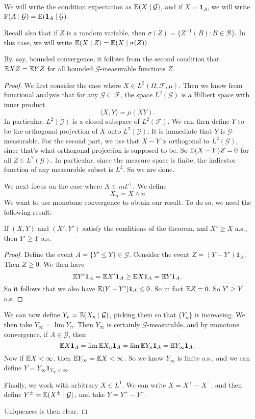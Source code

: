 \documentclass[a4paper]{article}
\begin{document}
We will write the condition expectation as $\mathbb{E}(X \mid \mathcal{G})$, and if $X = \mathbf{1}_A$, we will write $\mathbb{P}(A \mid \mathcal{G}) = \mathbb{E}(\mathbf{1}_A \mid \mathcal{G})$.

Recall also that if $Z$ is a random variable, then $\sigma(Z) = \{Z^{-1}(B): B \in \mathcal{B}\}$. In this case, we will write $\mathbb{E}(X \mid Z) = \mathbb{E}(X \mid \sigma(Z))$.

By, say, bounded convergence, it follows from the second condition that $\mathbb{E} XZ = \mathbb{E} YZ$ for all bounded $\mathcal{G}$-measurable functions $Z$.
\begin{proof}
  We first consider the case where $X \in L^2(\Omega, \mathcal{F}, \mu)$. Then we know from functional analysis that for any $\mathcal{G} \subseteq \mathcal{F}$, the space $L^2(\mathcal{G})$ is a Hilbert space with inner product
  \[
    \langle X, Y \rangle = \mu (X Y).
  \]
  In particular, $L^2(\mathcal{G})$ is a closed subspace of $L^2(\mathcal{F})$. We can then define $Y$ to be the orthogonal projection of $X$ onto $L^2(\mathcal{G})$. It is immediate that $Y$ is $\mathcal{G}$-measurable. For the second part, we use that $X - Y$ is orthogonal to $L^2(\mathcal{G})$, since that's what orthogonal projection is supposed to be. So $\mathbb{E}(X - Y)Z = 0$ for all $Z \in L^2(\mathcal{G})$. In particular, since the measure space is finite, the indicator function of any measurable subset is $L^2$. So we are done.

  We next focus on the case where $X \in m\mathcal{E}^+$. We define
  \[
    X_n = X \wedge n
  \]
  We want to use monotone convergence to obtain our result. To do so, we need the following result:

  \begin{claim}
    If $(X, Y)$ and $(X', Y')$ satisfy the conditions of the theorem, and $X' \geq X$ a.s., then $Y' \geq Y$ a.s.
  \end{claim}

  \begin{proof}
    Define the event $A = \{Y' \leq Y\} \in \mathcal{G}$. Consider the event $Z = (Y - Y')\mathbf{1}_A$. Then $Z \geq 0$. We then have
    \[
      \mathbb{E} Y' \mathbf{1}_A = \mathbb{E} X' \mathbf{1}_A \geq \mathbb{E} X \mathbf{1}_A = \mathbb{E} Y \mathbf{1}_A.
    \]
    So it follows that we also have $\mathbb{E}(Y - Y')\mathbf{1}_A \leq 0$. So in fact $\mathbb{E} Z = 0$. So $Y' \geq Y$ a.s.
  \end{proof}
  We can now define $Y_n = \mathbb{E}(X_n \mid \mathcal{G})$, picking them so that $\{Y_n\}$ is increasing. We then take $Y_\infty = \lim Y_n$. Then $Y_\infty$ is certainly $\mathcal{G}$-measurable, and by monotone convergence, if $A \in \mathcal{G}$, then
  \[
    \mathbb{E} X \mathbf{1}_A = \lim \mathbb{E} X_n \mathbf{1}_A = \lim \mathbb{E} Y_n \mathbf{1}_A = \mathbb{E} Y_\infty \mathbf{1}_A.
  \]
  Now if $\mathbb{E} X < \infty$, then $\mathbb{E} Y_\infty = \mathbb{E} X < \infty$. So we know $Y_\infty$ is finite a.s., and we can define $Y = Y_\infty \mathbf{1}_{Y_\infty < \infty}$.

  Finally, we work with arbitrary $X \in L^1$. We can write $X = X^+ - X^-$, and then define $Y^\pm = \mathbb{E} (X^\pm \mid \mathcal{G})$, and take $Y = Y^+ - Y^-$.

  Uniqueness is then clear.
\end{proof}
\end{document}

